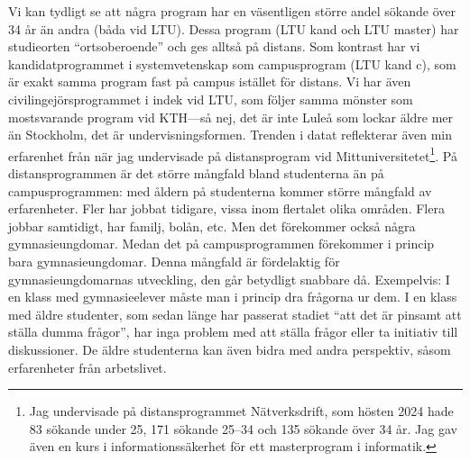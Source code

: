\documentclass[a4paper,oneside,article,swedish]{memoir}
\begin{document}
Vi kan tydligt se att några program har en väsentligen större andel sökande 
över 34 år än andra (båda vid LTU).
Dessa program (LTU kand och LTU master) har studieorten \enquote{ortsoberoende} 
och ges alltså på distans.
Som kontrast har vi kandidatprogrammet i systemvetenskap som campusprogram (LTU 
kand c), som är exakt samma program fast på campus istället för distans.
Vi har även civilingejörsprogrammet i indek vid LTU, som följer samma mönster 
som mostsvarande program vid KTH---så nej, det är inte Luleå som lockar äldre 
mer än Stockholm, det är undervisningsformen.
Trenden i datat reflekterar även min erfarenhet från när jag undervisade på 
distansprogram vid Mittuniversitetet\footnote{%
  Jag undervisade på distansprogrammet Nätverksdrift, som hösten 2024 hade 83 
  sökande under 25, 171 sökande 25--34 och 135 sökande över 34 år.
  Jag gav även en kurs i informationssäkerhet för ett masterprogram i 
  informatik.
}.
På distansprogrammen är det större mångfald bland studenterna än på 
campusprogrammen:
med åldern på studenterna kommer större mångfald av erfarenheter.
Fler har jobbat tidigare, vissa inom flertalet olika områden.
Flera jobbar samtidigt, har familj, bolån, etc.
Men det förekommer också några gymnasieungdomar.
Medan det på campusprogrammen förekommer i princip bara gymnasieungdomar.
Denna mångfald är fördelaktig för gymnasieungdomarnas utveckling, den går 
betydligt snabbare då.
Exempelvis:
I en klass med gymnasieelever måste man i princip dra frågorna ur dem.
I en klass med äldre studenter, som sedan länge har passerat stadiet 
\enquote{att det är pinsamt att ställa dumma frågor}, har inga problem med att 
ställa frågor eller ta initiativ till diskussioner.
De äldre studenterna kan även bidra med andra perspektiv, såsom erfarenheter 
från arbetslivet.
\end{document}

